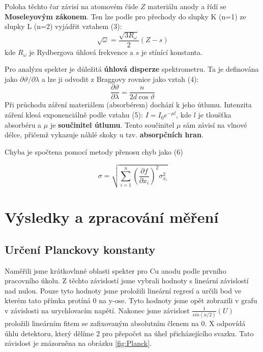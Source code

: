 Poloha těchto čar závisí na atomovém čísle $Z$ materiálu anody a řídí se \textbf{Moseleyovým zákonem}. Ten lze podle \cite{bib:studijni-text} pro přechody do slupky K (n=1) ze slupky L (n=2) vyjádřit vztahem (3):
%
$$ \sqrt{\omega} = \frac{\sqrt{3R_{\omega}}}{2}(Z-s) $$
%
kde $R_{\omega}$ je Rydbergova úhlová frekvence a $s$ je stínící konstanta.

Pro analýzu spekter je důležitá \textbf{úhlová disperze} spektrometru. Ta je definována jako $\partial\vartheta / \partial\lambda$ a lze ji odvodit z Braggovy rovnice jako vztah (4):
%
$$ \frac{\partial\vartheta}{\partial\lambda} = \frac{n}{2d \cos \vartheta} $$
%
Při průchodu záření materiálem (absorbérem) dochází k jeho útlumu. Intenzita záření klesá exponenciálně podle vztahu (5): $I = I_0 e^{-\mu l}$, kde $l$ je tloušťka absorbéru a $\mu$ je \textbf{součinitel útlumu}. Tento součinitel $\mu$ sám závisí na vlnové délce, přičemž vykazuje náhlé skoky u tzv. \textbf{absorpčních hran}.


Chyba je spočtena pomocí metody přenosu chyb \cite{bib:metoda-prenosu-chyb} jako (6)

\begin{equation}
    \nonumber
    \sigma = \sqrt{\sum^n_{i=1} \left( \frac{\partial f}{\partial x_i} \right)^2 \sigma^2_{x_i}}
\end{equation}

\section{Výsledky a zpracování měření}

\subsection{Určení Planckovy konstanty}
Naměřili jsme krátkovlnné oblasti spekter pro Cu anodu podle prvního pracovního úkolu. Z těchto závislostí jsme vybrali hodnoty s lineární závislostí nad nulou. Pouze tyto hodnoty jsme proložili lineární regresí a určili bod ve kterém tato přímka protíná 0 na y-ose. Tyto hodnoty jsme opět zobrazili v grafu v závislosti na urychlovacím napětí. Nakonec jsme závislost $\frac{1}{sin(x/2)}(U)$ proložili lineárním fitem se zafixovaným absolutním členem na 0. X odpovídá úhlu detektoru, který dělíme 2 pro přepočet na úhel přicházejícího svazku. Tato závislost je znázorněna na obrázku \ref{fig:Planck}.

